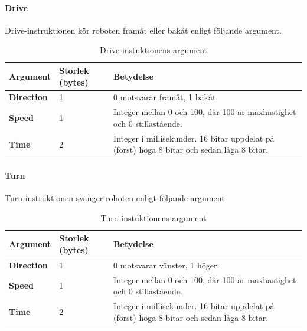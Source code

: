 \documentclass[a4paper,11pt]{article}
\begin{document}
\paragraph{Drive}
Drive-instruktionen kör roboten framåt eller bakåt enligt följande argument.
\begin{table}[h!]
    \centering
    \begin{tabular}{|l|l|l|}
    	\hline
    	Argument           & Storlek (bytes) & Betydelse                                                                                  \\ \hline
    	\textbf{Direction} & 1               & 0 motsvarar framåt, 1 bakåt.                                                               \\
    	\textbf{Speed}     & 1               & Integer mellan 0 och 100, där 100 är maxhastighet och 0 stillastående.                     \\
    	\textbf{Time}      & 2               & Integer i millisekunder. 16 bitar uppdelat på (först) höga 8 bitar och sedan låga 8 bitar. \\ \hline
    \end{tabular}
    \caption{Drive-instuktionens argument}
\end{table}

\paragraph{Turn}
Turn-instruktionen svänger roboten enligt följande argument.
\begin{table}[h!]
    \centering
    \begin{tabular}{|l|l|l|}
    	\hline
    	Argument           & Storlek (bytes) & Betydelse                                                                                  \\ \hline
    	\textbf{Direction} & 1               & 0 motsvarar vänster, 1 höger.                                                              \\
    	\textbf{Speed}     & 1               & Integer mellan 0 och 100, där 100 är maxhastighet och 0 stillastående.                     \\
    	\textbf{Time}      & 2               & Integer i millisekunder. 16 bitar uppdelat på (först) höga 8 bitar och sedan låga 8 bitar. \\ \hline
    \end{tabular}
    \caption{Turn-instuktionens argument}
\end{table}
\end{document}
